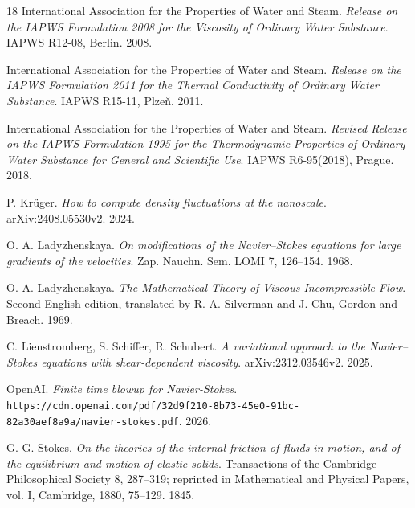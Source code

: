 \begin{thebibliography}{18}
International Association for the Properties of Water and Steam. \emph{Release on the IAPWS Formulation 2008 for the Viscosity of Ordinary Water Substance}. IAPWS R12-08, Berlin. 2008.

International Association for the Properties of Water and Steam. \emph{Release on the IAPWS Formulation 2011 for the Thermal Conductivity of Ordinary Water Substance}. IAPWS R15-11, Plze\v{n}. 2011.

International Association for the Properties of Water and Steam. \emph{Revised Release on the IAPWS Formulation 1995 for the Thermodynamic Properties of Ordinary Water Substance for General and Scientific Use}. IAPWS R6-95(2018), Prague. 2018.

P. Kr\"uger. \emph{How to compute density fluctuations at the nanoscale}. arXiv:2408.05530v2. 2024.

O. A. Ladyzhenskaya. \emph{On modifications of the Navier--Stokes equations for large gradients of the velocities}. Zap. Nauchn. Sem. LOMI 7, 126--154. 1968.

O. A. Ladyzhenskaya. \emph{The Mathematical Theory of Viscous Incompressible Flow}. Second English edition, translated by R. A. Silverman and J. Chu, Gordon and Breach. 1969.

C. Lienstromberg, S. Schiffer, R. Schubert. \emph{A variational approach to the Navier--Stokes equations with shear-dependent viscosity}. arXiv:2312.03546v2. 2025.

OpenAI. \emph{Finite time blowup for Navier-Stokes}. \texttt{https:/\allowbreak{}/\allowbreak{}cdn.openai.com/\allowbreak{}pdf/\allowbreak{}32d9f210-8b73-45e0-91bc-82a30aef8a9a/\allowbreak{}navier-stokes.pdf}. 2026.

G. G. Stokes. \emph{On the theories of the internal friction of fluids in motion, and of the equilibrium and motion of elastic solids}. Transactions of the Cambridge Philosophical Society 8, 287--319; reprinted in Mathematical and Physical Papers, vol. I, Cambridge, 1880, 75--129. 1845.

\end{thebibliography}
